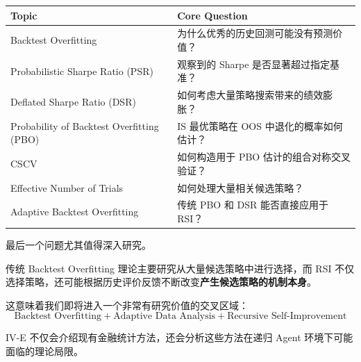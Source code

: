 \begin{readertable}
\begin{longtable}[]{@{}
  >{\raggedright\arraybackslash}p{}
  >{\raggedright\arraybackslash}p{}@{}}
\toprule
Topic & Core Question \\
\midrule
\endhead
Backtest Overfitting & 为什么优秀的历史回测可能没有预测价值？ \\
Probabilistic Sharpe Ratio (PSR) & 观察到的 Sharpe 是否显著超过指定基准？ \\
Deflated Sharpe Ratio (DSR) & 如何考虑大量策略搜索带来的绩效膨胀？ \\
Probability of Backtest Overfitting (PBO) & IS 最优策略在 OOS 中退化的概率如何估计？ \\
CSCV & 如何构造用于 PBO 估计的组合对称交叉验证？ \\
Effective Number of Trials & 如何处理大量相关候选策略？ \\
Adaptive Backtest Overfitting & 传统 PBO 和 DSR 能否直接应用于 RSI？ \\
\bottomrule
\end{longtable}
\end{readertable}

最后一个问题尤其值得深入研究。

传统 Backtest Overfitting 理论主要研究从大量候选策略中进行选择，而 RSI 不仅选择策略，还可能根据历史评价反馈不断改变\textbf{产生候选策略的机制本身}。

这意味着我们即将进入一个非常有研究价值的交叉区域：
\[\boxed{
\text{Backtest Overfitting}
+
\text{Adaptive Data Analysis}
+
\text{Recursive Self-Improvement}
}\]

IV-E 不仅会介绍现有金融统计方法，还会分析这些方法在递归 Agent 环境下可能面临的理论局限。

